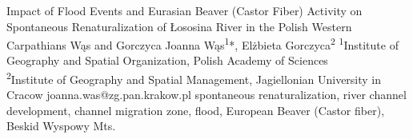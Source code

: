 \abstract
{Impact of Flood Events and Eurasian Beaver (Castor Fiber) Activity on Spontaneous Renaturalization of Łososina River in the Polish Western Carpathians} %
{Wąs and Gorczyca} %
{Joanna Wąs\textsuperscript{1}*, Elżbieta Gorczyca\textsuperscript{2}} %
{\POtag} %
{\textsuperscript{1}Institute of Geography and Spatial Organization, Polish Academy of Sciences\\
	\textsuperscript{2}Institute of Geography and Spatial Management, Jagiellonian University in Cracow} %
{joanna.was@zg.pan.krakow.pl}  %
{spontaneous renaturalization, river channel development, channel migration zone, flood, European Beaver (Castor fiber), Beskid Wyspowy Mts.}%
